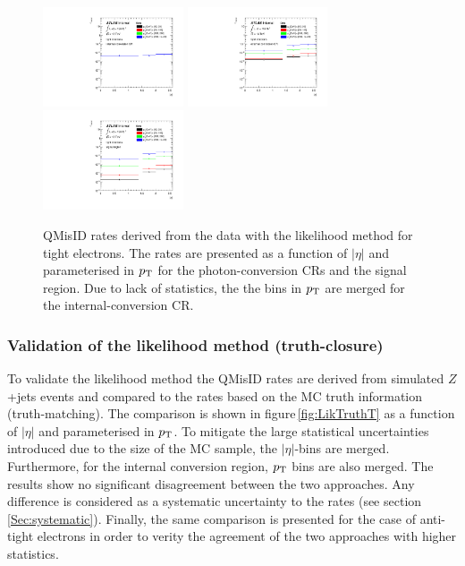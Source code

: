 \begin{figure}[tb!]
  \centering
  {\includegraphics[width=0.37\textwidth]{figures/qmisid/crateData_tight_m0}}
  {\includegraphics[width=0.37\textwidth]{figures/qmisid/crateData_tight_m1}}\\
  {\includegraphics[width=0.37\textwidth]{figures/qmisid/crateData_tight_m2}}
  \caption{QMisID rates derived from the data with the likelihood method for tight electrons. 
           The rates are presented as a function of $|\eta|$ and parameterised in $p_{\mathrm{T}}$ for the 
           photon-conversion CRs and the signal region. Due to lack of statistics, the
           the bins in $p_{\mathrm{T}}$ are merged for the internal-conversion CR.\label{fig:Lik2Ddata}}
\end{figure}

\subsubsection{Validation of the likelihood method (truth-closure)}

To validate the likelihood method the QMisID rates are derived from simulated $Z$+jets events and compared to the 
rates based on the MC truth information (truth-matching). The comparison is shown in figure\,\ref{fig:LikTruthT} 
as a function of $|\eta|$ and parameterised in $p_{\mathrm{T}}$. To mitigate the large statistical uncertainties introduced due 
to the size of the MC sample, the $|\eta|$-bins are merged. Furthermore, for the internal conversion region, $p_{\mathrm{T}}$ 
bins are also merged. The results show no significant disagreement between the two approaches. Any difference is 
considered as a systematic uncertainty to the rates (see section\,\ref{Sec:systematic}). Finally, the same comparison 
is presented for the case of anti-tight electrons in order to verity the agreement of the two approaches with 
higher statistics.  

